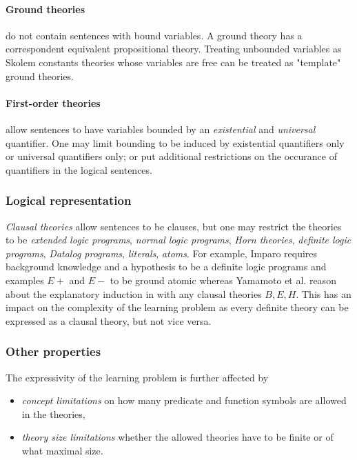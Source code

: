 \paragraph{Ground theories} do not contain sentences with bound variables. A ground theory has a correspondent equivalent propositional theory. Treating unbounded variables as Skolem constants theories whose variables are free can be treated as "template" ground theories.
\paragraph{First-order theories} allow sentences to have variables bounded by an \emph{existential} and \emph{universal} quantifier. One may limit bounding to be induced by existential quantifiers only or universal quantifiers only; or put additional restrictions on the occurance of quantifiers in the logical sentences.

\subsubsection{Logical representation}
\emph{Clausal theories} allow sentences to be clauses, but one may restrict the theories to be \emph{extended logic programs}, \emph{normal logic programs}, 
\emph{Horn theories}, \emph{definite logic programs}, \emph{Datalog programs}, \emph{literals}, \emph{atoms}. For example, Imparo\cite{kimber2012learning} requires background knowledge and a hypothesis to be a definite logic programs and examples $E+$ and $E-$ to be ground atomic whereas Yamamoto et al. reason about the explanatory induction in \cite{yamamoto2012inverse} with any clausal theories $B, E, H$. This has an impact on the complexity of the learning problem as every definite theory can be expressed as a clausal theory, but not vice versa.

\subsubsection{Other properties}
The expressivity of the learning problem is further affected by
\begin{itemize}
\item \emph{concept limitations} on how many predicate and function symbols are allowed in the theories,
\item \emph{theory size limitations} whether the allowed theories have to be finite or of what maximal size. 
\end{itemize}


